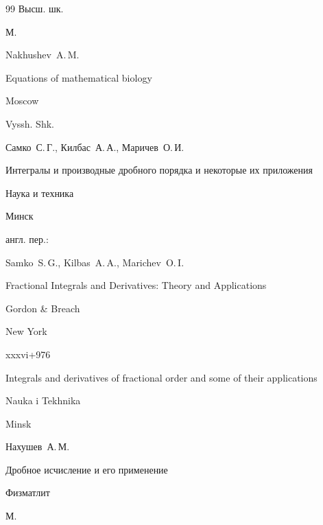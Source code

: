\begin{thebibliography}{99}
\publ Высш. шк.

\publaddr М.



\misctransl

\by Nakhushev~A.\,M.

\book Equations of mathematical biology

\publaddr Moscow

\publ Vyssh. Shk.






\by Самко~С.\,Г., Килбас~А.\,А., Маричев~О.\,И.

\book Интегралы и производные дробного порядка и некоторые их приложения

\publ Наука и техника

\publaddr Минск



\transl англ. пер.:~

\by Samko~S.\,G., Kilbas~A.\,A., Marichev~O.\,I.

\book Fractional Integrals and Derivatives: Theory and Applications 

\publ Gordon \& Breach

\publaddr New York


\totalpages xxxvi+976





\book Integrals and derivatives of fractional order and some of their applications

\publ Nauka i Tekhnika

\publaddr Minsk






\by Нахушев~А.\,М.

\book Дробное исчисление и его применение 

\publ Физматлит

\publaddr М.



\misctransl


\end{thebibliography}
